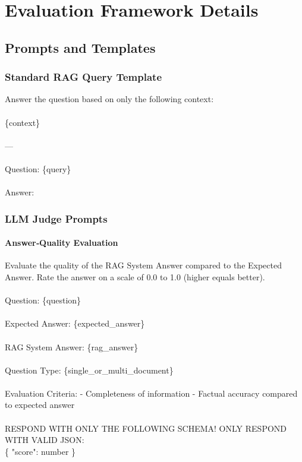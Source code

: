 \appendix


\chapter{Evaluation Framework Details}
\section{Prompts and Templates}\label{sec:prompts}

\subsection{Standard RAG Query Template}\label{subsec:rag-template}
\begin{tcolorbox}[title=Standard RAG Query]
Answer the question based on only the following context:\\\\
\{context\}\\\\
---\\\\
Question: \{query\}\\\\
Answer:
\end{tcolorbox}

\subsection{LLM Judge Prompts}\label{subsec:judge-prompts}

\subsubsection{Answer‐Quality Evaluation}\label{subsec:aq-prompt}
\begin{tcolorbox}[title=LLM Judge – Answer Quality]
Evaluate the quality of the RAG System Answer compared to the Expected Answer.  
Rate the answer on a scale of 0.0 to 1.0 (higher equals better).\\\\
Question: \{question\}\\\\
Expected Answer: \{expected\_answer\}\\\\
RAG System Answer: \{rag\_answer\}\\\\
Question Type: \{single\_or\_multi\_document\}\\\\
Evaluation Criteria:
- Completeness of information  
- Factual accuracy compared to expected answer  \\\\
RESPOND WITH ONLY THE FOLLOWING SCHEMA! ONLY RESPOND WITH VALID JSON:\\
\{ "score": number \}
\end{tcolorbox}

